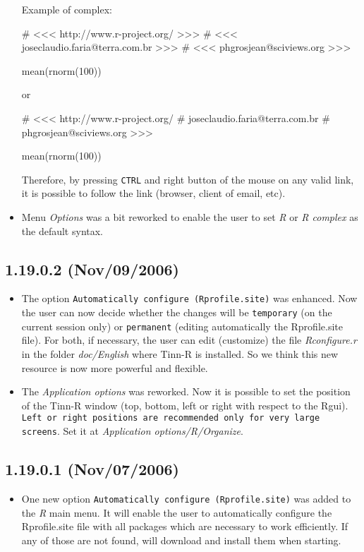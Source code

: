 \begin{itemize}
    Example of \RR{} complex:

    \begin{Scode}
      # <<< http://www.r-project.org/ >>>
      # <<< joseclaudio.faria@terra.com.br >>>
      # <<< phgrosjean@sciviews.org >>>

      mean(rnorm(100))
    \end{Scode}

    or

    \begin{Scode}
      # <<< http://www.r-project.org/
      #     joseclaudio.faria@terra.com.br
      #     phgrosjean@sciviews.org >>>

      mean(rnorm(100))
    \end{Scode}

    Therefore, by pressing \texttt{CTRL} and right button of the mouse on any
    valid link, it is possible to follow the link (browser, client of email, etc).
  \item Menu \textit{Options} was a bit reworked to enable the user to set
    \textit{R} or \textit{R complex} as the default syntax.
\end{itemize}


\subsection*{1.19.0.2 (Nov/09/2006)}
\begin{itemize}
  \item The option \texttt{Automatically configure \RR{} (Rprofile.site)}
    was enhanced. Now the user can now decide whether the changes will be
    \texttt{temporary} (on the current session only) or \texttt{permanent}
    (editing automatically the Rprofile.site file). For both, if necessary,
    the user can edit (customize) the file \textit{Rconfigure.r} in the
    folder \textit{doc/English} where Tinn-R is installed. So we think this
    new resource is now more powerful and flexible.
  \item The \textit{Application options} was reworked. Now it is possible to
    set the position of the Tinn-R window (top, bottom, left or right with
    respect to the Rgui). \texttt{Left or right positions are recommended only for very
      large screens}. Set it at \textit{Application options/R/Organize}.
\end{itemize}


\subsection*{1.19.0.1 (Nov/07/2006)}
\begin{itemize}
  \item One new option \texttt{Automatically configure \RR{} (Rprofile.site)}
    was added to the \textit{R} main menu. It will enable the user to
    automatically configure the Rprofile.site file with all packages which
    are necessary to work efficiently. If any of those are not found, \RR{}
    will download and install them when starting.
\end{itemize}



